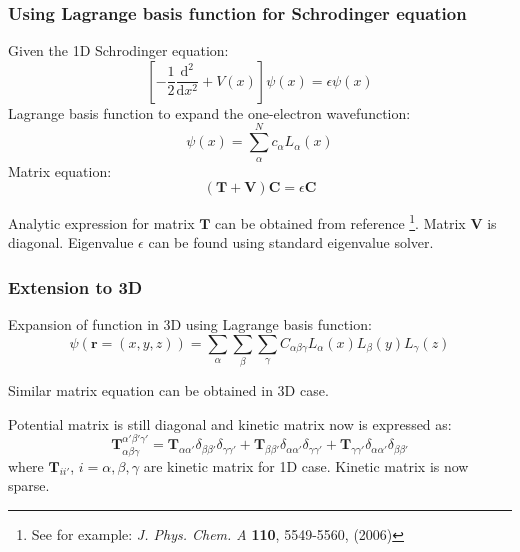 \documentclass[10pt,t]{beamer}
\begin{document}
\begin{frame}
\frametitle{Using Lagrange basis function for Schrodinger equation}

Given the 1D Schrodinger equation:
\begin{equation*}
\left[ -\frac{1}{2}\frac{\mathrm{d}^2}{\mathrm{d}x^2} + V(x)\right ] \psi(x)
= \epsilon \psi(x)
\end{equation*}
Lagrange basis function to expand the one-electron wavefunction:
\begin{equation*}
\psi(x) = \sum_{\alpha}^{N} c_{\alpha} L_{\alpha}(x)
\end{equation*}
Matrix equation:
\begin{equation*}
\left( \mathbf{T} + \mathbf{V} \right) \mathbf{C} = \epsilon \mathbf{C}
\end{equation*}

Analytic expression for matrix $\mathbf{T}$ can be obtained from reference
\footnote{See for example: \textit{J. Phys. Chem. A}
\textbf{110}, {5549-5560}, (2006)}.
Matrix $\mathbf{V}$ is diagonal.
Eigenvalue $\epsilon$ can be found using standard eigenvalue solver.

\end{frame}



\begin{frame}
\frametitle{Extension to 3D}

Expansion of function in 3D using Lagrange basis function:
\begin{equation*}
\psi(\mathbf{r} = (x,y,z)) =
\sum_{\alpha}\sum_{\beta}\sum_{\gamma} C_{\alpha\beta\gamma}
L_{\alpha}(x) L_{\beta}(y) L_{\gamma}(z)
\end{equation*}

Similar matrix equation can be obtained in 3D case.

Potential matrix is still diagonal and kinetic matrix now is expressed as:
\begin{equation*}
\mathbf{T}_{\alpha\beta\gamma}^{\alpha'\beta'\gamma'} =
\mathbf{T}_{\alpha\alpha'}\delta_{\beta\beta'}\delta_{\gamma\gamma'} +
\mathbf{T}_{\beta\beta'}\delta_{\alpha\alpha'}\delta_{\gamma\gamma'} +
\mathbf{T}_{\gamma\gamma'}\delta_{\alpha\alpha'}\delta_{\beta\beta'}
\end{equation*}
where $\mathbf{T}_{ii'}$, $i=\alpha,\beta,\gamma$ are kinetic matrix for 1D case.
Kinetic matrix is now sparse.

\end{frame}
\end{document}
